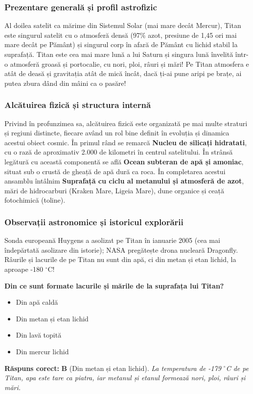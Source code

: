 \subsubsection*{Prezentare generală și profil astrofizic}
Al doilea satelit ca mărime din Sistemul Solar (mai mare decât Mercur), Titan este singurul satelit cu o atmosferă densă (97\% azot, presiune de 1,45 ori mai mare decât pe Pământ) și singurul corp în afară de Pământ cu lichid stabil la suprafață. Titan este cea mai mare lună a lui Saturn și singura lună învelită într-o atmosferă groasă și portocalie, cu nori, ploi, râuri și mări! Pe Titan atmosfera e atât de deasă și gravitația atât de mică încât, dacă ți-ai pune aripi pe brațe, ai putea zbura dând din mâini ca o pasăre!

\subsubsection*{Alcătuirea fizică și structura internă}
Privind în profunzimea sa, alcătuirea fizică este organizată pe mai multe straturi și regiuni distincte, fiecare având un rol bine definit în evoluția și dinamica acestui obiect cosmic. În primul rând se remarcă \textbf{Nucleu de silicați hidratati}, cu o rază de aproximativ 2.000 de kilometri în centrul satelitului. În strânsă legătură cu această componentă se află \textbf{Ocean subteran de apă și amoniac}, situat sub o crustă de gheață de apă dură ca roca. În completarea acestui ansamblu întâlnim \textbf{Suprafață cu ciclu al metanului și atmosferă de azot}, mări de hidrocarburi (Kraken Mare, Ligeia Mare), dune organice și ceață fotochimică (toline).

\subsubsection*{Observații astronomice și istoricul explorării}
Sonda europeană Huygens a asolizat pe Titan în ianuarie 2005 (cea mai îndepărtată asolizare din istorie); NASA pregătește drona nucleară Dragonfly. Râurile și lacurile de pe Titan nu sunt din apă, ci din metan și etan lichid, la aproape -180 $^\circ$C!

\vspace{6pt}
\begin{tcolorbox}[orbitarquiz, title={\textbf{Întrebare de verificare \#20: Titan}}]
\textbf{Din ce sunt formate lacurile și mările de la suprafața lui Titan?}
\begin{itemize}[leftmargin=2.2em, itemsep=2pt, topsep=4pt]
  \item[$\square$ \textbf{A.}] Din apă caldă
  \item[$\square$ \textbf{B.}] Din metan și etan lichid
  \item[$\square$ \textbf{C.}] Din lavă topită
  \item[$\square$ \textbf{D.}] Din mercur lichid
\end{itemize}
\vspace{2pt}
{\footnotesize\color{orbitarMuted}\textbf{Răspuns corect:} \textbf{B} (Din metan și etan lichid). \emph{La temperatura de -179 $^\circ$C de pe Titan, apa este tare ca piatra, iar metanul și etanul formează nori, ploi, râuri și mări.}}
\end{tcolorbox}
\clearpage


